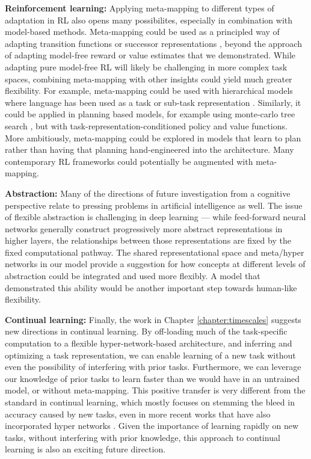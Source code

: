 \textbf{Reinforcement learning:} Applying meta-mapping to different types of adaptation in RL also opens many possibilites, especially in combination with model-based methods. Meta-mapping could be used as a principled way of adapting transition functions or successor representations \citep[c.f.][]{Madarasz2019}, beyond the approach of adapting model-free reward or value estimates that we demonstrated. While adapting pure model-free RL will likely be challenging in more complex task spaces, combining meta-mapping with other insights could yield much greater flexibility. For example, meta-mapping could be used with hierarchical models where language has been used as a task or sub-task representation \citep[e.g.][]{Jiang2019}. Similarly, it could be applied in planning based models, for example using monte-carlo tree search \citep[as in e.g.][]{Silver2016, Silver2017}, but with task-representation-conditioned policy and value functions. More ambitiously, meta-mapping could be explored in models that learn to plan \citep{Guez2019} rather than having that planning hand-engineered into the architecture. Many contemporary RL frameworks could potentially be augmented with meta-mapping. \par

\textbf{Abstraction:} Many of the directions of future investigation from a cognitive perspective relate to pressing problems in artificial intelligence as well. The issue of flexible abstraction is challenging in deep learning --- while feed-forward neural networks generally construct progressively more abstract representations in higher layers, the relationships between those representations are fixed by the fixed computational pathway. The shared representational space and meta/hyper networks in our model provide a suggestion for how concepts at different levels of abstraction could be integrated and used more flexibly. A model that demonstrated this ability would be another important step towards human-like flexibility. \par 

\textbf{Continual learning:} Finally, the work in Chapter \ref{chapter:timescales} suggests new directions in continual learning. By off-loading much of the task-specific computation to a flexible hyper-network-based architecture, and inferring and optimizing a task representation, we can enable learning of a new task without even the possibility of interfering with prior tasks. Furthermore, we can leverage our knowledge of prior tasks to learn faster than we would have in an untrained model, or without meta-mapping. This positive transfer is very different from the standard in continual learning, which mostly focuses on stemming the bleed in accuracy caused by new tasks, even in more recent works that have also incorporated hyper networks \citep{Oswald2020}. Given the importance of learning rapidly on new tasks, without interfering with prior knowledge, this approach to continual learning is also an exciting future direction. \par 

